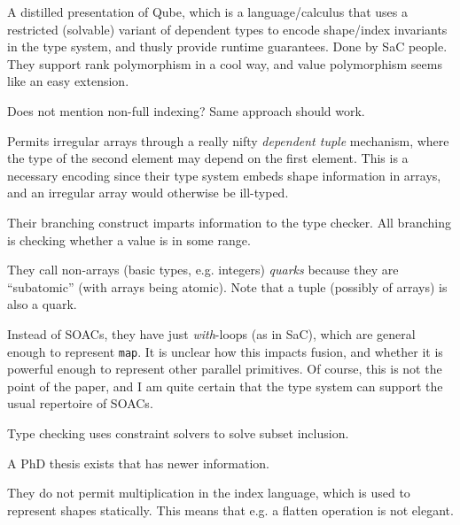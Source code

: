\documentclass[a4paper, oneside, final]{memoir}
\begin{document}
\begin{quote}
\end{quote}

A distilled presentation of Qube, which is a language/calculus that
uses a restricted (solvable) variant of dependent types to encode
shape/index invariants in the type system, and thusly provide runtime
guarantees.  Done by SaC people.  They support rank polymorphism in a
cool way, and value polymorphism seems like an easy extension.

Does not mention non-full indexing?  Same approach should work.

Permits irregular arrays through a really nifty \textit{dependent
  tuple} mechanism, where the type of the second element may depend on
the first element.  This is a necessary encoding since their type
system embeds shape information in arrays, and an irregular array
would otherwise be ill-typed.

Their branching construct imparts information to the type checker.
All branching is checking whether a value is in some range.

They call non-arrays (basic types, e.g. integers) \textit{quarks}
because they are ``subatomic'' (with arrays being atomic).  Note that
a tuple (possibly of arrays) is also a quark.

Instead of SOACs, they have just \textit{with}-loops (as in SaC),
which are general enough to represent \texttt{map}.  It is unclear how
this impacts fusion, and whether it is powerful enough to represent
other parallel primitives.  Of course, this is not the point of the
paper, and I am quite certain that the type system can support the
usual repertoire of SOACs.

Type checking uses constraint solvers to solve subset inclusion.

A PhD thesis exists that has newer information.

They do not permit multiplication in the index language, which is used
to represent shapes statically.  This means that e.g. a flatten
operation is not elegant.
\end{document}
